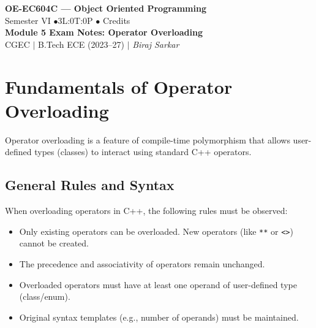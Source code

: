 \documentclass[12pt,a4paper]{article}
\begin{document}

\begin{center}
  {\LARGE\bfseries\color{myred} OE-EC604C --- Object Oriented Programming}\\[5pt]
  {\normalsize\color{mydark} Semester VI \quad$\bullet$\quad 3L:0T:0P \quad$\bullet$ Credits}\\[3pt]
  {\normalsize\color{myteal}\textbf{Module 5 Exam Notes: Operator Overloading}}\\[3pt]
  {\small\color{mydark} CGEC \;$|$\; B.Tech ECE (2023--27) \;$|$\; \textit{Biraj Sarkar}}
\end{center}
\vspace{2pt}
\noindent{\color{myred}\rule{\linewidth}{1.5pt}}
\vspace{2pt}

\hypersetup{linkcolor=mydark}
\tableofcontents
\hypersetup{linkcolor=myteal}
\newpage

\section{Fundamentals of Operator Overloading}

Operator overloading is a feature of compile-time polymorphism that allows user-defined types (classes) to interact using standard C++ operators.

\subsection{General Rules and Syntax}
When overloading operators in C++, the following rules must be observed:
\begin{itemize}[leftmargin=*, itemsep=3pt]
  \item Only existing operators can be overloaded. New operators (like \texttt{**} or \texttt{<>}) cannot be created.
  \item The precedence and associativity of operators remain unchanged.
  \item Overloaded operators must have at least one operand of user-defined type (class/enum).
  \item Original syntax templates (e.g., number of operands) must be maintained.
\end{itemize}
\end{document}
